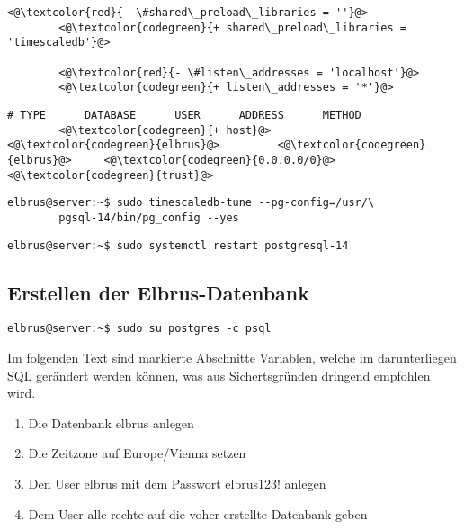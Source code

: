 \documentclass{article}
\begin{document}
	\lstset{style=files}
	\begin{lstlisting}[caption={var/lib/pgsql/14/data/postgresql.conf - Ändern der folgenden Zeilen.}, numbers=none]
		<@\textcolor{red}{- \#shared\_preload\_libraries = ''}@>
		<@\textcolor{codegreen}{+ shared\_preload\_libraries = 'timescaledb'}@>
		
		<@\textcolor{red}{- \#listen\_addresses = 'localhost'}@>
		<@\textcolor{codegreen}{+ listen\_addresses = '*'}@>
	\end{lstlisting}
	
	\begin{lstlisting}[caption={var/lib/pgsql/14/data/ph\_hba.conf - Ändern der folgenden Zeilen.}, numbers=none]
		# TYPE      DATABASE      USER      ADDRESS      METHOD
		<@\textcolor{codegreen}{+ host}@>       <@\textcolor{codegreen}{elbrus}@>         <@\textcolor{codegreen}{elbrus}@>     <@\textcolor{codegreen}{0.0.0.0/0}@>      <@\textcolor{codegreen}{trust}@>
	\end{lstlisting}
	
	\lstset{style=commands}
	\begin{lstlisting}[caption={Anpassen der Datenbank Einstellungen auf die Server Hardware.}]
		elbrus@server:~$ sudo timescaledb-tune --pg-config=/usr/\
		pgsql-14/bin/pg_config --yes
	\end{lstlisting}

	\begin{lstlisting}[caption={Neustarten des Services um Änderungen zu übernehmen.}]
		elbrus@server:~$ sudo systemctl restart postgresql-14
	\end{lstlisting}

	\newpage
	\subsection{Erstellen der Elbrus-Datenbank}
	\begin{lstlisting}[caption={Verbinden mit dem interaktiven Terminal von 'postgres'.}]
		elbrus@server:~$ sudo su postgres -c psql
	\end{lstlisting}
	Im folgenden Text sind markierte Abschnitte Variablen, welche im darunterliegen SQL gerändert werden können, was aus Sichertsgründen dringend empfohlen wird.
	\begin{enumerate}
		\item Die Datenbank elbrus anlegen
		\item Die Zeitzone auf Europe/Vienna setzen
		\item Den User elbrus mit dem Passwort elbrus123! anlegen
		\item Dem User alle rechte auf die voher erstellte Datenbank geben
	\end{enumerate}	
\end{document}
